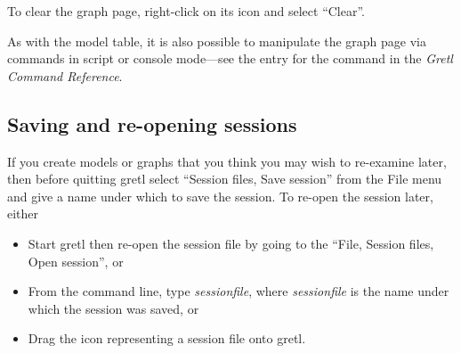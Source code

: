 To clear the graph page, right-click on its icon and select ``Clear''.

As with the model table, it is also possible to manipulate the graph
page via commands in script or console mode---see the entry for the
 command in the \emph{Gretl Command Reference}.


\subsection{Saving and re-opening sessions}
\label{session-save}

If you create models or graphs that you think you may wish to
re-examine later, then before quitting gretl select ``Session
files, Save session'' from the File menu and give a name under
which to save the session.  To re-open the session later, either

\begin{itemize}
\item Start gretl then re-open the session file by going to the
  ``File, Session files, Open session'', or
\item From the command line, type  \textsl{sessionfile},
  where \textsl{sessionfile} is the name under which the session was
  saved, or
\item Drag the icon representing a session file onto gretl.
\end{itemize}




